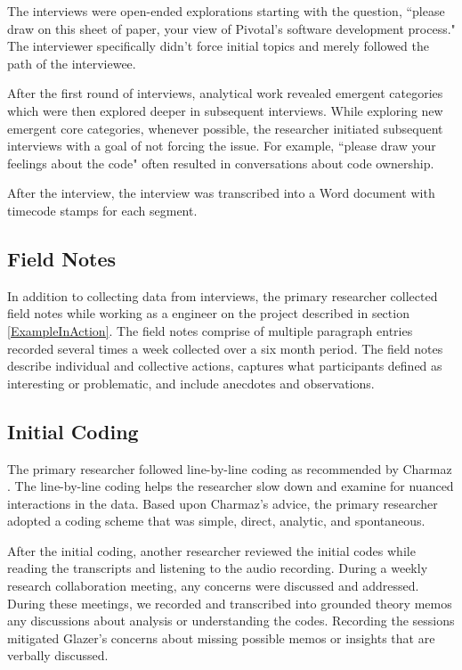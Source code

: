 The interviews were open-ended explorations starting with the question, ``please draw on this sheet of paper, your view of Pivotal's software development process." The interviewer specifically didn't force initial topics and merely followed the path of the interviewee. 

After the first round of interviews, analytical work revealed emergent categories which were then explored deeper in subsequent interviews. While exploring new emergent core categories, whenever possible, the researcher initiated subsequent interviews with a goal of not forcing the issue. For example, ``please draw your feelings about the code" often resulted in conversations about code ownership. 

After the interview, the interview was transcribed into a Word document with timecode stamps for each segment.

\subsection{Field Notes}
In addition to collecting data from interviews, the primary researcher collected field notes while working as a engineer on the project described in section \ref{ExampleInAction}. The field notes comprise of multiple paragraph entries recorded several times a week collected over a six month period. The field notes describe individual and collective actions, captures what participants defined as interesting or problematic, and include anecdotes and observations. 
\subsection{Initial Coding}
The primary researcher followed line-by-line coding as recommended by Charmaz \cite{Charmaz}. The line-by-line coding helps the researcher slow down and examine for nuanced interactions in the data. Based upon Charmaz's advice, the primary researcher adopted a coding scheme that was simple, direct, analytic, and spontaneous.  

After the initial coding, another researcher reviewed the initial codes while reading the transcripts and listening to the audio recording. During a weekly research collaboration meeting, any concerns were discussed and addressed. During these meetings, we recorded and transcribed into grounded theory memos any discussions about analysis or understanding the codes. Recording the sessions mitigated Glazer's concerns about missing possible memos or insights that are verbally discussed. \cite{GlaserTheoreticalSensitivity}

